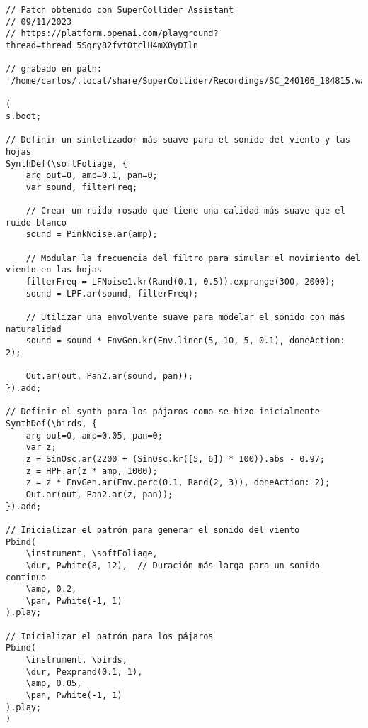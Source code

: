 \begin{minipage}[t]{1\textwidth}
    \centering
    \begin{lstlisting}[style=SuperCollider-IDE, basicstyle=\footnotesize\ttfamily, numbers=none]
// Patch obtenido con SuperCollider Assistant
// 09/11/2023
// https://platform.openai.com/playground?thread=thread_5Sqry82fvt0tclH4mX0yDIln

// grabado en path: '/home/carlos/.local/share/SuperCollider/Recordings/SC_240106_184815.wav'

(
s.boot;

// Definir un sintetizador más suave para el sonido del viento y las hojas
SynthDef(\softFoliage, {
    arg out=0, amp=0.1, pan=0;
    var sound, filterFreq;

    // Crear un ruido rosado que tiene una calidad más suave que el ruido blanco
    sound = PinkNoise.ar(amp);

    // Modular la frecuencia del filtro para simular el movimiento del viento en las hojas
    filterFreq = LFNoise1.kr(Rand(0.1, 0.5)).exprange(300, 2000);
    sound = LPF.ar(sound, filterFreq);

    // Utilizar una envolvente suave para modelar el sonido con más naturalidad
    sound = sound * EnvGen.kr(Env.linen(5, 10, 5, 0.1), doneAction: 2);

    Out.ar(out, Pan2.ar(sound, pan));
}).add;

// Definir el synth para los pájaros como se hizo inicialmente
SynthDef(\birds, {
    arg out=0, amp=0.05, pan=0;
    var z;
    z = SinOsc.ar(2200 + (SinOsc.kr([5, 6]) * 100)).abs - 0.97;
    z = HPF.ar(z * amp, 1000);
    z = z * EnvGen.ar(Env.perc(0.1, Rand(2, 3)), doneAction: 2);
    Out.ar(out, Pan2.ar(z, pan));
}).add;

// Inicializar el patrón para generar el sonido del viento
Pbind(
    \instrument, \softFoliage,
    \dur, Pwhite(8, 12),  // Duración más larga para un sonido continuo
    \amp, 0.2,
    \pan, Pwhite(-1, 1)
).play;

// Inicializar el patrón para los pájaros
Pbind(
    \instrument, \birds,
    \dur, Pexprand(0.1, 1),
    \amp, 0.05,
    \pan, Pwhite(-1, 1)
).play;
)                                    
    \end{lstlisting}
    \vspace{1cm}
\end{minipage}

















